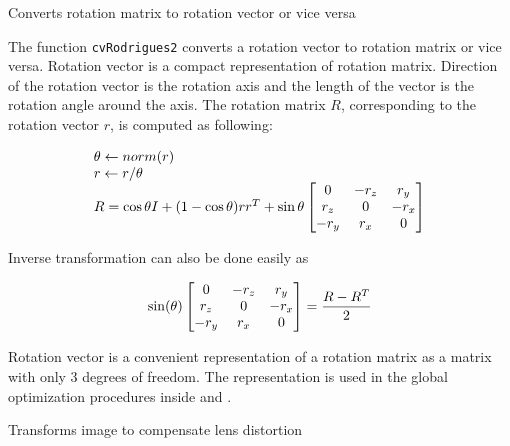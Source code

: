 \label{Rodrigues2}

Converts rotation matrix to rotation vector or vice versa


\begin{description}
\end{description}

The function \texttt{cvRodrigues2} converts a rotation vector to rotation matrix or vice versa. Rotation vector is a compact representation of rotation matrix. Direction of the rotation vector is the rotation axis and the length of the vector is the rotation angle around the axis. The rotation matrix $R$, corresponding to the rotation vector $r$, is computed as following:

\[
\begin{array}{l}
\theta \leftarrow norm(r)\\
r \leftarrow r/\theta\\
R = \cos{\theta} I + (1-\cos{\theta}) r r^T + \sin{\theta}
\begin{bmatrix} 0 & -r_z & r_y\\ r_z & 0 & -r_x\\ -r_y & r_x & 0 \end{bmatrix}
\end{array}
\]

Inverse transformation can also be done easily as

\[
\sin(\theta)
\begin{bmatrix} 0 & -r_z & r_y\\ r_z & 0 & -r_x\\ -r_y & r_x & 0 \end{bmatrix}
=
\frac{R - R^T}{2}
\]

Rotation vector is a convenient representation of a rotation matrix
as a matrix with only 3 degrees of freedom. The representation is
used in the global optimization procedures inside
and .

\label{Undistort2}

Transforms image to compensate lens distortion


